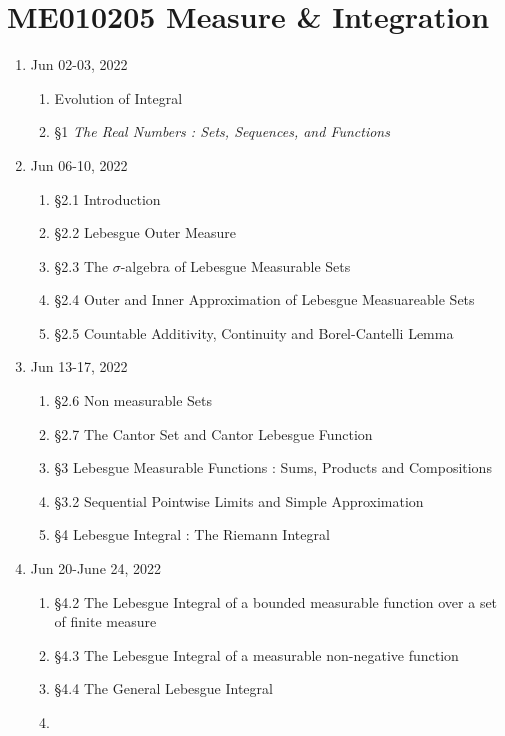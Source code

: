 \chapter{ME010205 Measure \& Integration}
\begin{enumerate}[label=Week \arabic*]
	\item Jun 02-03, 2022
	\begin{enumerate}[label=Day \arabic*]
		\item 
			Evolution of Integral
		\item
			\S1 \textit{The Real Numbers : Sets, Sequences, and Functions}
	\end{enumerate}
	\item Jun 06-10, 2022 
	\begin{enumerate}[label=Day \arabic*]
		\item 
			\S2.1 Introduction 
		\item 
			\S2.2 Lebesgue Outer Measure
		\item 
			\S2.3 The $\sigma$-algebra of Lebesgue Measurable Sets
		\item 
			\S2.4 Outer and Inner Approximation of Lebesgue Measuareable Sets
		\item 
			\S2.5 Countable Additivity, Continuity and Borel-Cantelli Lemma
	\end{enumerate}
	\item Jun 13-17, 2022 
	\begin{enumerate}[label=Day \arabic*]
		\item 
			\S2.6 Non measurable Sets
		\item 
			\S2.7 The Cantor Set and Cantor Lebesgue Function
		\item 
			\S3 Lebesgue Measurable Functions : Sums, Products and Compositions
		\item 
			\S3.2 Sequential Pointwise Limits and Simple Approximation
		\item 
			\S4 Lebesgue Integral : The Riemann Integral
	\end{enumerate}
	\item Jun 20-June 24, 2022 
	\begin{enumerate}[label=Day \arabic*]
		\item 
			\S4.2 The Lebesgue Integral of a bounded measurable function over a set of finite measure
		\item 
			\S4.3 The Lebesgue Integral of a measurable non-negative function
		\item 
			\S4.4 The General Lebesgue Integral
		\item 


\end{enumerate}
\end{enumerate}
